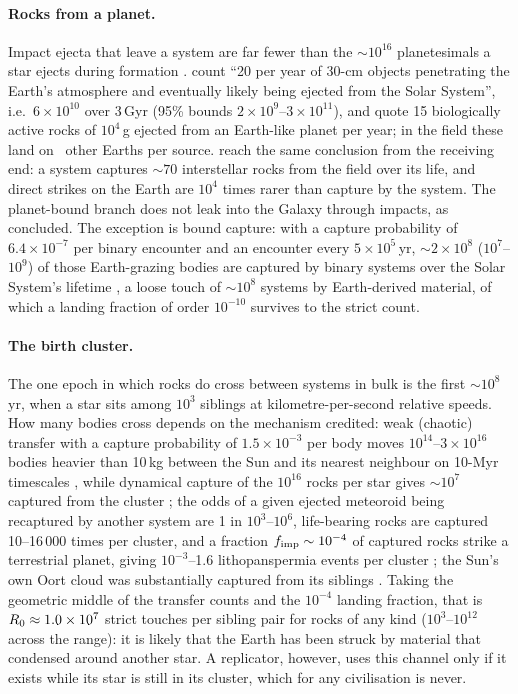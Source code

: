 \documentclass[11pt]{article}
\begin{document}
\paragraph{Rocks from a planet.}  Impact ejecta that leave a system are far
fewer than the $\sim10^{16}$ planetesimals a star ejects during formation
\citep{Do2018,AdamsNapier2022}.  \citet{SirajLoeb2020grazing} count
``20 per year of 30-cm objects penetrating the Earth's atmosphere and
eventually likely being ejected from the Solar System'', i.e.\ $6\times10^{10}$
over 3\,Gyr (95\% bounds $2\times10^{9}$--$3\times10^{11}$), and
\citet{AdamsNapier2022} quote 15 biologically active rocks of $10^{4}$\,g
ejected from an Earth-like planet per year; in the field these land on
\EjectaRZeroStrict\ other Earths per source.  \citet{AdamsNapier2022} reach the
same conclusion from the receiving end: a system captures $\sim70$ interstellar
rocks from the field over its life, and direct strikes on the Earth are
$10^{4}$ times rarer than capture by the system.  The planet-bound branch does
not leak into the Galaxy through impacts, as \citet{Melosh2003} concluded.  The
exception is bound capture: with a capture probability of $6.4\times10^{-7}$
per binary encounter and an encounter every $5\times10^{5}$\,yr,
$\sim2\times10^{8}$ ($10^{7}$--$10^{9}$) of those Earth-grazing bodies are
captured by binary systems over the Solar System's lifetime
\citep{SirajLoeb2020grazing}, a loose touch of $\sim10^{8}$ systems by
Earth-derived material, of which a landing fraction of order $10^{-10}$
survives to the strict count.

\paragraph{The birth cluster.}  The one epoch in which rocks do cross between
systems in bulk is the first $\sim10^{8}$\,yr, when a star sits among $10^{3}$
siblings at kilometre-per-second relative speeds.  How many bodies cross
depends on the mechanism credited: weak (chaotic) transfer with a capture
probability of $1.5\times10^{-3}$ per body moves $10^{14}$--$3\times10^{16}$
bodies heavier than 10\,kg between the Sun and its nearest neighbour on
10-Myr timescales \citep{Belbruno2012}, while dynamical capture of the
$10^{16}$ rocks per star gives $\sim10^{7}$ captured from the cluster
\citep{AdamsNapier2022}; the odds of a given ejected meteoroid being recaptured
by another system are 1 in $10^{3}$--$10^{6}$, life-bearing rocks are captured
10--16\,000 times per cluster, and a fraction $f_{\rm imp}\sim10^{-4}$ of
captured rocks strike a terrestrial planet, giving $10^{-3}$--1.6
lithopanspermia events per cluster \citep{AdamsSpergel2005}; the Sun's own
Oort cloud was substantially captured from its siblings \citep{Levison2010}.
Taking the geometric middle of the transfer counts and the $10^{-4}$ landing
fraction, that is $R_{0}\approx1.0\times10^{7}$ strict touches per sibling
pair for rocks of any kind ($10^{3}$--$10^{12}$ across the range): it is likely
that the Earth has been struck by material that condensed around another
star.  A replicator, however, uses this channel only
if it exists while its star is still in its cluster, which for any
civilisation is never.
\end{document}
